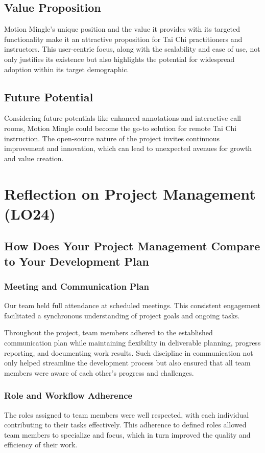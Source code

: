 \documentclass{article}
\begin{document}
\subsection{Value Proposition}
Motion Mingle's unique position and the value it provides with its targeted functionality make it an attractive proposition for Tai Chi practitioners and instructors. 
This user-centric focus, along with the scalability and ease of use, not only justifies its existence but also highlights the potential for widespread adoption within its target demographic. 
\subsection{Future Potential}
Considering future potentials like enhanced annotations and interactive call rooms, Motion Mingle could become the go-to solution for remote Tai Chi instruction. 
The open-source nature of the project invites continuous improvement and innovation, which can lead to unexpected avenues for growth and value creation.

\section{Reflection on Project Management (LO24)}
\subsection{How Does Your Project Management Compare to Your Development Plan}
\subsubsection{Meeting and Communication Plan}
Our team held full attendance at scheduled meetings. This consistent engagement facilitated a synchronous understanding of project goals and ongoing tasks.

Throughout the project, team members adhered to the established communication plan while maintaining flexibility in deliverable planning, progress reporting, and documenting work results.
Such discipline in communication not only helped streamline the development process but also ensured that all team members were aware of each other's progress and challenges. 
\subsubsection{Role and Workflow Adherence}
The roles assigned to team members were well respected, with each individual contributing to their tasks effectively. This adherence to defined roles allowed team members to specialize and focus, which in turn improved the quality and efficiency of their work.
\end{document}
